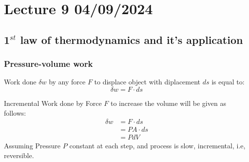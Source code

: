 \documentclass[fleqn,10pt]{SelfArx} %
\begin{document}
\clearpage

\section{Lecture 9 04/09/2024}
\subsection{1$^{st}$ law of thermodynamics and it's application}
\subsubsection*{Pressure-volume work}
Work done $\delta w$ by any force $F$ to displace object with diplacement $ds$ is equal to:
\begin{equation}
    \delta w = F \cdot ds
    \label{eq:work_done}
\end{equation}

Incremental Work done by Force $F$ to increase the volume will be given as follows:
\begin{align}
    \delta w &= F \cdot ds \\
    &= PA\cdot ds \\
    &= PdV
    \label{eq:Pressure_volume_work}
\end{align}
Assuming Pressure $P$ constant at each step, and process is slow, incremental, i.e, reversible.
\end{document}
